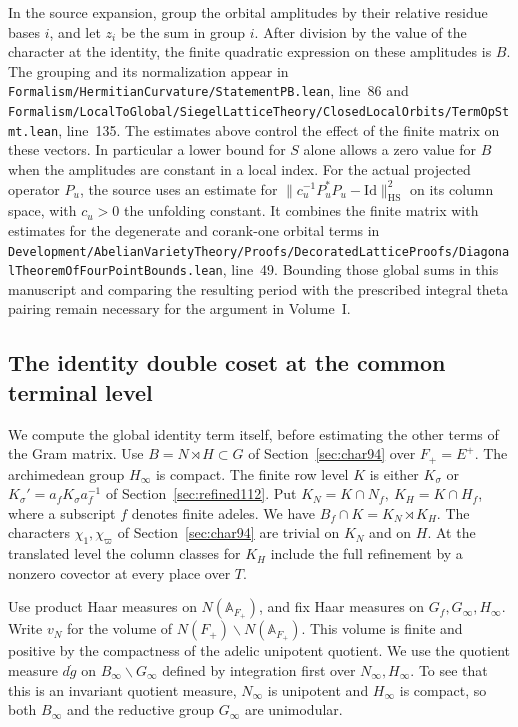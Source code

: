 \documentclass[a4paper,11pt]{article}
\theoremstyle{definition}
\theoremstyle{remark}
\newcommand{\srcloc}[2]{{\small\nolinkurl{#1.lean}}, line~#2}
\numberwithin{equation}{section}
\begin{document}
In the source expansion, group the orbital amplitudes by their
relative residue bases \(i\), and let \(z_i\) be the sum in group
\(i\). After division by the value of the character at the identity,
the finite quadratic expression on these amplitudes is \(B\).
The grouping and its normalization appear in
\srcloc{Formalism/HermitianCurvature/StatementPB}{86} and
\srcloc{Formalism/LocalToGlobal/SiegelLatticeTheory/ClosedLocalOrbits/TermOpStmt}{135}.
The estimates above control the effect of the finite matrix on
these vectors. In particular a lower bound for \(S\) alone allows
a zero value for \(B\) when the amplitudes are constant in a local
index. For the actual projected operator \(P_u\), the source uses
an estimate for
\(\|c_u^{-1}P_u^*P_u-\mathrm{Id}\|_{\mathrm{HS}}^2\) on its
column space, with \(c_u>0\) the unfolding constant. It combines
the finite matrix with estimates for the degenerate and corank-one
orbital terms in
\srcloc{Development/AbelianVarietyTheory/Proofs/DecoratedLatticeProofs/DiagonalTheoremOfFourPointBounds}{49}.
Bounding those global sums in this manuscript and comparing the
resulting period with the prescribed integral theta pairing remain
necessary for the argument in Volume~I.

\subsection{The identity double coset at the common terminal level}\label{nav:VI-15}
\label{sec:identity127}

We compute the global identity term itself, before estimating the
other terms of the Gram matrix. Use \(B=N\rtimes H\subset G\) of
Section~\ref{sec:char94} over \(F_+=E^+\). The archimedean group
\(H_\infty\) is compact. The finite row level \(K\) is either
\(K_\sigma\) or \(K_\sigma'=a_fK_\sigma a_f^{-1}\) of
Section~\ref{sec:refined112}. Put \(K_N=K\cap N_f,\ K_H=K\cap H_f\),
where a subscript \(f\) denotes finite adeles. We have
\(B_f\cap K=K_N\rtimes K_H\). The characters \(\chi_1,\chi_\varpi\)
of Section~\ref{sec:char94} are trivial on \(K_N\) and on \(H\).
At the translated level the column classes for \(K_H\) include
the full refinement by a nonzero covector at every place over \(T\).

Use product Haar measures on \(N(\mathbb A_{F_+})\), and fix Haar
measures on \(G_f,G_\infty,H_\infty\). Write \(v_N\) for the volume
of \(N(F_+)\backslash N(\mathbb A_{F_+})\). This volume is finite
and positive by the compactness of the adelic unipotent quotient.
We use the quotient measure \(d\dot g\) on \(B_\infty\backslash
G_\infty\) defined by integration first over \(N_\infty,H_\infty\).
To see that this is an invariant quotient measure, \(N_\infty\)
is unipotent and \(H_\infty\) is compact, so both \(B_\infty\) and
the reductive group \(G_\infty\) are unimodular.
\end{document}
